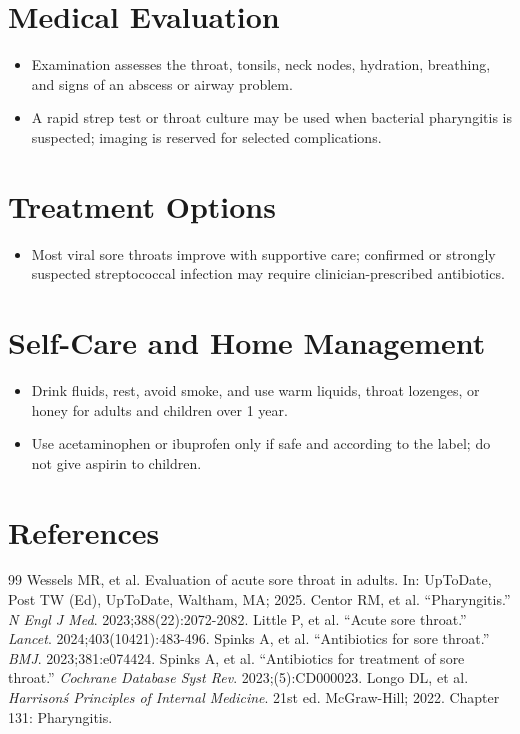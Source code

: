 \section*{Medical Evaluation}
\begin{itemize}
  \item Examination assesses the throat, tonsils, neck nodes, hydration, breathing, and signs of an abscess or airway problem.
  \item A rapid strep test or throat culture may be used when bacterial pharyngitis is suspected; imaging is reserved for selected complications.
\end{itemize}

\section*{Treatment Options}
\begin{itemize}
  \item Most viral sore throats improve with supportive care; confirmed or strongly suspected streptococcal infection may require clinician-prescribed antibiotics.
\end{itemize}

\section*{Self-Care and Home Management}
\begin{itemize}
  \item Drink fluids, rest, avoid smoke, and use warm liquids, throat lozenges, or honey for adults and children over 1 year.
  \item Use acetaminophen or ibuprofen only if safe and according to the label; do not give aspirin to children.
\end{itemize}

\section*{References}
\begin{thebibliography}{99}
 Wessels MR, et al. Evaluation of acute sore throat in adults. In: UpToDate, Post TW (Ed), UpToDate, Waltham, MA; 2025.
 Centor RM, et al. ``Pharyngitis.'' \emph{N Engl J Med}. 2023;388(22):2072-2082.
 Little P, et al. ``Acute sore throat.'' \emph{Lancet}. 2024;403(10421):483-496.
 Spinks A, et al. ``Antibiotics for sore throat.'' \emph{BMJ}. 2023;381:e074424.
 Spinks A, et al. ``Antibiotics for treatment of sore throat.'' \emph{Cochrane Database Syst Rev}. 2023;(5):CD000023.
 Longo DL, et al. \emph{Harrison\'s Principles of Internal Medicine}. 21st ed. McGraw-Hill; 2022. Chapter 131: Pharyngitis.
\end{thebibliography}
